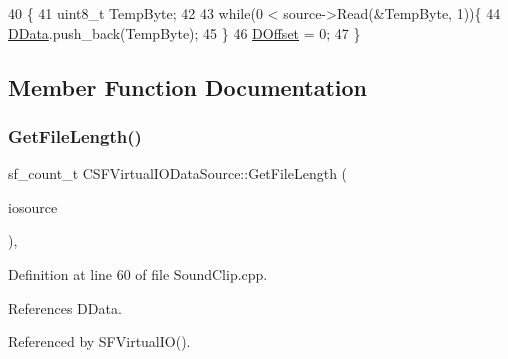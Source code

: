 \begin{DoxyCode}
40                                                                                  \{
41     uint8\_t TempByte;
42     
43     \textcolor{keywordflow}{while}(0 < source->Read(&TempByte, 1))\{
44         \hyperlink{classCSFVirtualIODataSource_ac03be5c46b6647150e12edc04fa52ede}{DData}.push\_back(TempByte);   
45     \}
46     \hyperlink{classCSFVirtualIODataSource_a29db7bf8a3a7103deacb80bf619919c8}{DOffset} = 0;
47 \}
\end{DoxyCode}


\subsection{Member Function Documentation}
\hypertarget{classCSFVirtualIODataSource_a94ee0d9f4703661ca7f2cad8cf294690}{}\label{classCSFVirtualIODataSource_a94ee0d9f4703661ca7f2cad8cf294690} 
\subsubsection{\texorpdfstring{Get\+File\+Length()}{GetFileLength()}}
{\footnotesize\ttfamily sf\+\_\+count\+\_\+t C\+S\+F\+Virtual\+I\+O\+Data\+Source\+::\+Get\+File\+Length (\begin{DoxyParamCaption}\item[{\hyperlink{classCSFVirtualIODataSource}{C\+S\+F\+Virtual\+I\+O\+Data\+Source} $\ast$}]{iosource }\end{DoxyParamCaption})\hspace{0.3cm}{\ttfamily [static]}, {\ttfamily [protected]}}



Definition at line 60 of file Sound\+Clip.\+cpp.



References D\+Data.



Referenced by S\+F\+Virtual\+I\+O().


